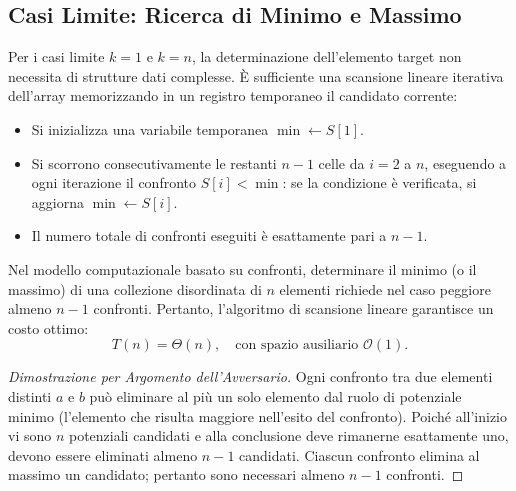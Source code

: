 \subsection{Casi Limite: Ricerca di Minimo e Massimo}
\label{subsec:selection-boundary-cases}

Per i casi limite $k = 1$ e $k = n$, la determinazione dell'elemento target non necessita di strutture dati complesse. È sufficiente una scansione lineare iterativa dell'array memorizzando in un registro temporaneo il candidato corrente:

\begin{itemize}
  \item Si inizializza una variabile temporanea $\min \leftarrow S[1]$.
  \item Si scorrono consecutivamente le restanti $n - 1$ celle da $i = 2$ a $n$, eseguendo a ogni iterazione il confronto $S[i] < \min$: se la condizione è verificata, si aggiorna $\min \leftarrow S[i]$.
  \item Il numero totale di confronti eseguiti è esattamente pari a $n - 1$.
\end{itemize}

\begin{property}[Ottimalità Asintotica per $k = 1$ e $k = n$]
Nel modello computazionale basato su confronti, determinare il minimo (o il massimo) di una collezione disordinata di $n$ elementi richiede nel caso peggiore almeno $n - 1$ confronti. Pertanto, l'algoritmo di scansione lineare garantisce un costo ottimo:
\begin{equation}
  T(n) = \Theta(n), \quad \text{con spazio ausiliario } \mathcal{O}(1).
\end{equation}
\end{property}

\begin{proof}[Dimostrazione per Argomento dell'Avversario]
Ogni confronto tra due elementi distinti $a$ e $b$ può eliminare al più un solo elemento dal ruolo di potenziale minimo (l'elemento che risulta maggiore nell'esito del confronto). Poiché all'inizio vi sono $n$ potenziali candidati e alla conclusione deve rimanerne esattamente uno, devono essere eliminati almeno $n - 1$ candidati. Ciascun confronto elimina al massimo un candidato; pertanto sono necessari almeno $n - 1$ confronti.
\end{proof}

